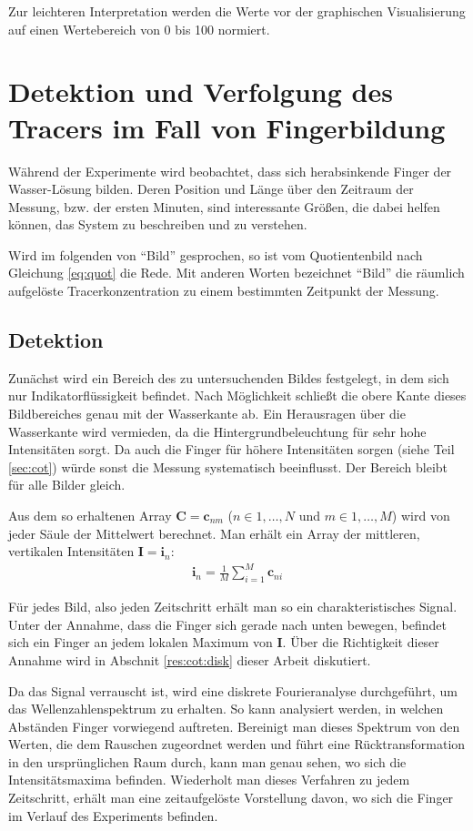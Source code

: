 Zur leichteren Interpretation werden die Werte vor der graphischen Visualisierung auf einen Wertebereich von 0 bis 100 normiert.

\section{Detektion und Verfolgung des Tracers im Fall von Fingerbildung}
\label{sec:track}
Während der \COTm Experimente wird beobachtet, dass sich herabsinkende Finger der Wasser-\COTm Lösung bilden. Deren Position und Länge über den Zeitraum der Messung, bzw. der ersten Minuten, sind interessante Größen, die dabei helfen können, das System zu beschreiben und zu verstehen.

Wird im folgenden von ``Bild'' gesprochen, so ist vom Quotientenbild nach Gleichung \ref{eq:quot} die Rede. Mit anderen Worten bezeichnet ``Bild'' die räumlich aufgelöste Tracerkonzentration zu einem bestimmten Zeitpunkt der Messung.

\subsection{Detektion}
\label{sec:dec}
Zunächst wird ein Bereich des zu untersuchenden Bildes festgelegt, in dem sich nur Indikatorflüssigkeit befindet. Nach Möglichkeit schließt die obere Kante dieses Bildbereiches genau mit der Wasserkante ab. Ein Herausragen über die Wasserkante wird vermieden, da die Hintergrundbeleuchtung für sehr hohe Intensitäten sorgt. Da auch die Finger für höhere Intensitäten sorgen (siehe Teil \ref{sec:cot}) würde sonst die Messung systematisch beeinflusst. Der Bereich bleibt für alle Bilder gleich.

Aus dem so erhaltenen Array $\mathbf{C} = \mathbf{c}_{nm}$ ($n \in 1,\dots,N$ und $m \in 1,\dots,M$) wird von jeder Säule der Mittelwert berechnet. Man erhält ein Array der mittleren, vertikalen Intensitäten $\mathbf{I} = \mathbf{i}_{n}$:
\begin{eqnarray}
 \mathbf{i}_{n} = \frac{1}{M} \sum_{i=1}^{M} \mathbf{c}_{ni}
\end{eqnarray}

Für jedes Bild, also jeden Zeitschritt erhält man so ein charakteristisches Signal. Unter der Annahme, dass die Finger sich gerade nach unten bewegen, befindet sich ein Finger an jedem lokalen Maximum von $\mathbf{I}$. Über die Richtigkeit dieser Annahme wird in Abschnit \ref{res:cot:disk} dieser Arbeit diskutiert. 

Da das Signal verrauscht ist, wird eine diskrete Fourieranalyse durchgeführt, um das Wellenzahlenspektrum zu erhalten. So kann analysiert werden, in welchen Abständen Finger vorwiegend auftreten. Bereinigt man dieses Spektrum von den Werten, die dem Rauschen zugeordnet werden und führt eine Rücktransformation in den ursprünglichen Raum durch, kann man genau sehen, wo sich die Intensitätsmaxima befinden. Wiederholt man dieses Verfahren zu jedem Zeitschritt, erhält man eine zeitaufgelöste Vorstellung davon, wo sich die Finger im Verlauf des Experiments befinden.


